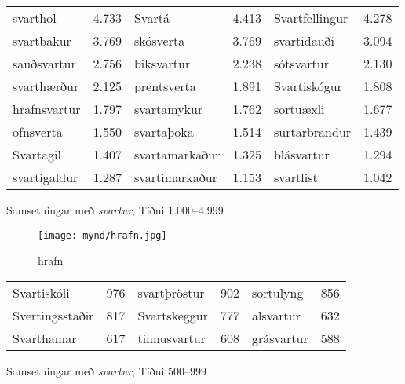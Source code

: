 \documentclass[../samsetningasafn.tex]{subfiles}
\begin{document}
\begin{wordlist}[H]
\begin{tcolorbox}

	\setlength{\extrarowheight}{3pt}
	\begin{tabular}{BlBlBl}
		svarthol	& 4.733	& 
		Svartá	& 4.413	& 
		Svartfellingur & 4.278	\\ 
		svartbakur	& 3.769	& 
		skósverta	& 3.769	& 
		svartidauði	& 3.094	\\ 
		sauðsvartur	& 2.756	& 
		biksvartur	& 2.238	& 
		sótsvartur	& 2.130	\\ 
		svarthærður	& 2.125	& 
		prentsverta	& 1.891	& 
		Svartiskógur	& 1.808	\\ 
		hrafnsvartur	& 1.797	& 
		svartamykur	& 1.762	& 
		sortuæxli	& 1.677	\\ 
		ofnsverta	& 1.550	& 
		svartaþoka	& 1.514	& 
		surtarbrandur & 1.439	\\ 
		Svartagil	& 1.407	& 
		svartamarkaður & 1.325	& 
		blásvartur 	& 1.294	\\ 
		svartigaldur	& 1.287	& 
		svartimarkaður & 1.153	& 
		svartlist	& 1.042	 
	\end{tabular}

\end{tcolorbox}
	\caption{Samsetningar með \textit{svartur}, Tíðni 1.000--4.999}
	\label{listi:svart.1000}
\end{wordlist}

\begin{figure}[H]
\begin{tcolorbox}
\centering
	\texttt{[image: mynd/hrafn.jpg]}
\end{tcolorbox}
	\caption{hrafn}
	\label{mynd:hrafn}
\end{figure}

\begin{wordlist}[H]
\begin{tcolorbox}

	\setlength{\extrarowheight}{3pt}
	\begin{tabular}{BlBlBl}
		Svartiskóli 	& 976		& 
		svartþröstur	& 902		& 
		sortulyng	& 856		\\ 
		Svertingsstaðir & 817	& 
		Svartskeggur & 777		& 
		alsvartur	& 632		\\ 
		Svarthamar	& 617		& 
		tinnusvartur	& 608		& 
		grásvartur 	& 588		 
	\end{tabular}

\end{tcolorbox}
	\caption{Samsetningar með \textit{svartur}, Tíðni 500--999}
	\label{listi:svart.500}
\end{wordlist}	
\end{document}
